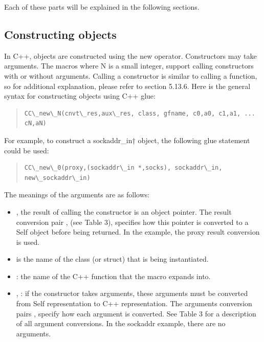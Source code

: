 \documentclass[letterpaper,10pt,english]{sphinxmanual}
\begin{document}
Each of these parts will be explained in the following sections.


\subsection{Constructing objects}
\label{vmref:index-79}\label{vmref:constructing-objects}
In C++, objects are constructed using the new operator. Constructors may take arguments. The
macros  where N is a small integer, support calling constructors with or without arguments.
Calling a constructor is similar to calling a function, so for additional explanation, please
refer to section 5.13.6. Here is the general syntax for constructing objects using C++ glue:
\begin{quote}

\begin{Verbatim}[commandchars=\\\{\}]
CC\_new\_N(cnvt\_res,aux\_res, class, gfname, c0,a0, c1,a1, ... cN,aN)
\end{Verbatim}
\end{quote}

For example, to construct a sockaddr\_in† object, the following glue statement could be used:
\begin{quote}

\begin{Verbatim}[commandchars=\\\{\}]
CC\_new\_0(proxy,(sockaddr\_in *,socks), sockaddr\_in, new\_sockaddr\_in)
\end{Verbatim}
\end{quote}

The meanings of the  arguments are as follows:
\begin{itemize}
\item {} 
,  the result of calling the constructor is an object pointer. The result
conversion pair ,  (see Table 3), specifies how this pointer is converted
to a Self object before being returned. In the  example, the proxy result conversion
is used.

\item {} 
 is the name of the class (or struct) that is being instantiated.

\item {} 
: the name of the C++ function that the  macro expands into.

\item {} 
, : if the constructor takes arguments, these arguments must be converted from Self
representation to C++ representation. The arguments conversion pairs ,  specify how
each argument is converted. See Table 3 for a description of all argument conversions. In
the sockaddr example, there are no arguments.

\end{itemize}
\end{document}
